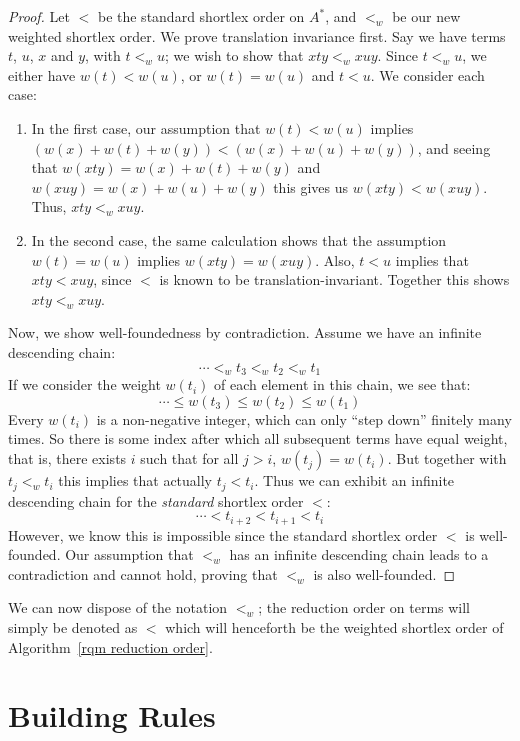 \documentclass[../generics]{subfiles}
\begin{document}
\begin{proof}
Let $<$ be the standard shortlex order on $A^*$, and $<_w$ be our new weighted shortlex order. We prove translation invariance first. Say we have terms $t$, $u$, $x$ and $y$, with $t<_w u$; we wish to show that $xty<_w xuy$. Since $t<_w u$, we either have $w(t)<w(u)$, or $w(t)=w(u)$ and $t<u$. We consider each case:
\begin{enumerate}
\item In the first case, our assumption that $w(t)<w(u)$ implies $(w(x)+w(t)+w(y))<(w(x)+w(u)+w(y))$, and seeing that $w(xty)=w(x)+w(t)+w(y)$ and $w(xuy)=w(x)+w(u)+w(y)$ this gives us $w(xty)<w(xuy)$. Thus, $xty<_w xuy$.
\item In the second case, the same calculation shows that the assumption $w(t)=w(u)$ implies $w(xty)=w(xuy)$. Also, $t<u$ implies that $xty<xuy$, since $<$ is known to be translation-invariant. Together this shows $xty<_w xuy$.
\end{enumerate}
Now, we show well-foundedness by contradiction. Assume we have an infinite descending chain:
\[\cdots<_w  t_3<_w t_2<_w t_1\]
If we consider the weight $w(t_i)$ of each element in this chain, we see that:
\[\cdots\le w(t_3)\le w(t_2)\le w(t_1)\]
Every $w(t_i)$ is a non-negative integer, which can only ``step down'' finitely many times. So there is some index after which all subsequent terms have equal weight, that is, there exists $i$ such that for all $j>i$, $w(t_j)=w(t_i)$. But together with $t_j<_w t_i$ this implies that actually $t_j < t_i$. Thus we can exhibit an infinite descending chain for the \emph{standard} shortlex order $<$:
\[\cdots<t_{i+2}<t_{i+1}<t_i\]
However, we know this is impossible since the standard shortlex order $<$ is well-founded. Our assumption that $<_w$ has an infinite descending chain leads to a contradiction and cannot hold, proving that $<_w$ is also well-founded.
\end{proof}
We can now dispose of the notation $<_w$; the reduction order on terms will simply be denoted as $<$ which will henceforth be the weighted shortlex order of Algorithm~\ref{rqm reduction order}.

\section{Building Rules}\label{building rules}

%
%
\end{document}
